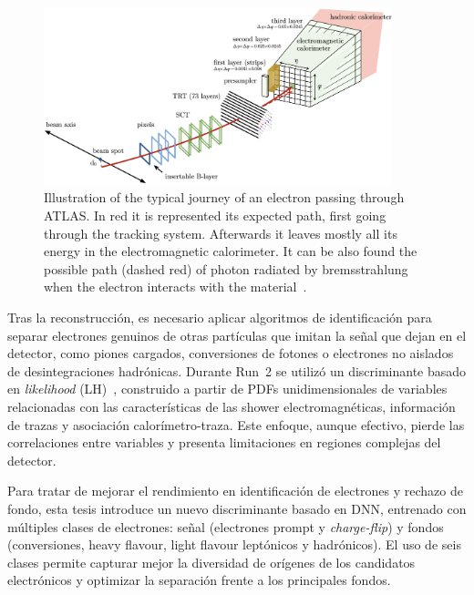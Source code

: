 \begin{figure}[htbp]
  \centering
  \includegraphics[width=0.9\textwidth]{images/electron_journey.png}
  \caption{Illustration of the typical journey of an electron passing through ATLAS. In red it is represented its expected path, first going through the tracking system. Afterwards it leaves mostly all its energy in the electromagnetic calorimeter. It can be also found the possible path (dashed red) of photon radiated by bremsstrahlung when the electron interacts with the material~\cite{Aaboud:2657964}.}
  \label{res:electron_journey}
\end{figure}

Tras la reconstrucción, es necesario aplicar algoritmos de identificación para separar electrones genuinos de otras partículas que imitan la señal que dejan en el detector, como piones cargados, conversiones de fotones o electrones no aislados de desintegraciones hadrónicas. Durante Run~2 se utilizó un discriminante basado en \textit{likelihood} (LH)~\cite{Aad:2684552,Aaboud:2657964}, construido a partir de PDFs unidimensionales de variables relacionadas con las características de las shower electromagnéticas, información de trazas y asociación calorímetro-traza. Este enfoque, aunque efectivo, pierde las correlaciones entre variables y presenta limitaciones en regiones complejas del detector.  

Para tratar de mejorar el rendimiento en identificación de electrones y rechazo de fondo, esta tesis introduce un nuevo discriminante basado en DNN, entrenado con múltiples clases de electrones: señal (electrones prompt y \textit{charge-flip}) y fondos (conversiones, heavy flavour, light flavour leptónicos y hadrónicos). El uso de seis clases permite capturar mejor la diversidad de orígenes de los candidatos electrónicos y optimizar la separación frente a los principales fondos.  

